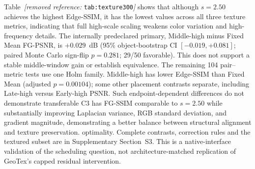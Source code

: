 \documentclass[times,twocolumn,final]{elsarticle}
\providecommand{\DIFadd}[1]{{\protect\color{blue} \sf #1}} %
\providecommand{\DIFdel}[1]{{\protect\color{red} \scriptsize #1}} %
\providecommand{\DIFaddbegin}{} %
\providecommand{\DIFaddend}{} %
\providecommand{\DIFdelbegin}{} %
\providecommand{\DIFdelend}{} %
\begin{document}
\DIFdelbegin \DIFdel{Table~\textit{[removed reference: }\texttt{tab:texture300}\textit{]} shows that although $s = 2.50$ achieves the highest Edge-SSIM, it has the lowest values across all three texture metrics, indicating that full high-scale scaling weakens color variation and high-frequency details. }\DIFdelend \DIFaddbegin \DIFadd{The internally predeclared primary, Middle-high minus Fixed Mean FG-PSNR, is $+0.029$~dB (95\% object-bootstrap CI $[-0.019,+0.081]$; paired Monte Carlo sign-flip $p=0.281$; 29/50 favorable). This does not support a stable middle-window gain or establish equivalence. The remaining 104 pair--metric tests use one Holm family. Middle-high has lower Edge-SSIM than Fixed Mean (adjusted $p=0.00104$); some other placement contrasts separate, including Late-high versus Early-high PSNR. Such endpoint-dependent differences do not demonstrate transferable }\DIFaddend C3 \DIFdelbegin \DIFdel{has FG-SSIM comparable to $s = 2.50$ while substantially improving Laplacian variance, RGB standard deviation, and gradient magnitude, demonstrating a better balance between structural alignment and texture preservation. }\DIFdelend \DIFaddbegin \DIFadd{optimality. Complete contrasts, correction rules and the textured subset are in Supplementary Section~S3. This is a native-interface validation of the scheduling question, not architecture-matched replication of GeoTex's capped residual intervention.
}\DIFaddend 
\end{document}
